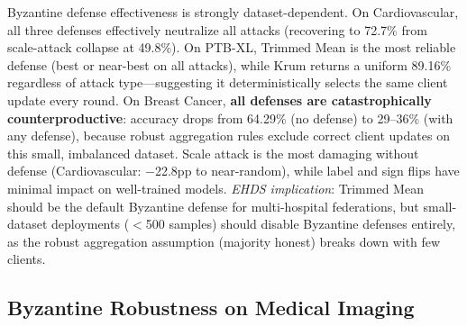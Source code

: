 \documentclass[conference,a4paper]{IEEEtran}
\begin{document}
\begin{table}[htbp]
\centering
\caption{Byzantine Robustness: Accuracy (\%) by Attack and Defense}
\label{tab:byzantine_extended}

\vspace{1mm}
\footnotesize{Byzantine defense effectiveness is strongly dataset-dependent. On Cardiovascular, all three defenses effectively neutralize all attacks (recovering to 72.7\% from scale-attack collapse at 49.8\%). On PTB-XL, Trimmed Mean is the most reliable defense (best or near-best on all attacks), while Krum returns a uniform 89.16\% regardless of attack type---suggesting it deterministically selects the same client update every round. On Breast Cancer, \textbf{all defenses are catastrophically counterproductive}: accuracy drops from 64.29\% (no defense) to 29--36\% (with any defense), because robust aggregation rules exclude correct client updates on this small, imbalanced dataset. Scale attack is the most damaging without defense (Cardiovascular: $-$22.8pp to near-random), while label and sign flips have minimal impact on well-trained models. \textit{EHDS implication}: Trimmed Mean should be the default Byzantine defense for multi-hospital federations, but small-dataset deployments ($<$500 samples) should disable Byzantine defenses entirely, as the robust aggregation assumption (majority honest) breaks down with few clients.}
\end{table}

\subsection{Byzantine Robustness on Medical Imaging}
\label{sec:byzantine_imaging}
\end{document}
